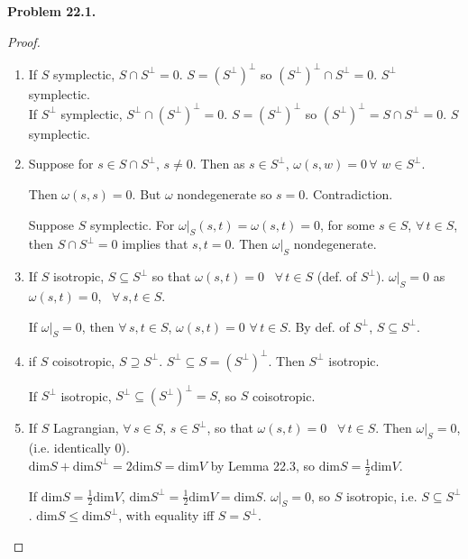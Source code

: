 \documentclass[11pt]{amsart}
\theoremstyle{definition}
\newcommand{\problemhead}[1]{\medskip\noindent\textbf{Problem #1.} }
\begin{document}
\problemhead{22.1}

\begin{proof}
\begin{enumerate}
  \item[(a)] If $S$ symplectic, $S \cap S^{\perp} = 0$.  $S=(S^{\perp})^{\perp}$ so $(S^{\perp})^{\perp} \cap S^{\perp} =0$.  $S^{\perp}$ symplectic.  \\
If $S^{\perp}$ symplectic, $S^{\perp} \cap (S^{\perp})^{\perp} = 0$.  $S=(S^{\perp})^{\perp}$ so $(S^{\perp})^{\perp} =S \cap S^{\perp} =0$.  $S$ symplectic.  \\
  \item[(b)] Suppose for $s\in S\cap S^{\perp}$, $s\neq 0$.  Then as $s\in S^{\perp}$, $\omega(s,w)=0 \, \forall \, \, w \in S^{\perp}$.

Then $\omega(s,s)=0$.  But $\omega$ nondegenerate so $s=0$.  Contradiction.

Suppose $S$ symplectic.  For $\left. \omega \right|_S(s,t) = \omega(s,t)=0$, for some $s \in S$, $\forall \, t \in S$, then $S\cap S^{\perp}=0$ implies that $s,t=0$.  Then $\left. \omega \right|_S$ nondegenerate.


  \item[(c)] If $S$ isotropic, $S\subseteq S^{\perp}$ so that $\omega(s,t)=0$ \, $\forall \, t \in S$ (def. of $S^{\perp}$).  $\left. \omega \right|_S =0$ as $\omega(s,t)=0$, \, $\forall \, s,t \in S$.

If $\left. \omega \right|_S =0$, then $\forall \, s,t \in S$, $\omega(s,t)=0 \, \, \forall \, t\in S$.  By def. of $S^{\perp}$, $S\subseteq S^{\perp}$.
  \item[(d)] if $S$ coisotropic, $S\supseteq S^{\perp}$.  $S^{\perp} \subseteq S=(S^{\perp})^{\perp}$.  Then $S^{\perp}$ isotropic.

If $S^{\perp}$ isotropic, $S^{\perp} \subseteq (S^{\perp})^{\perp} = S$, so $S$ coisotropic.
  \item[(e)] If $S$ Lagrangian, $\forall \, s \in S$, $s\in S^{\perp}$, so that $\omega(s,t) = 0$ \, $\forall \, t \in S$.  Then $\left. \omega \right|_S =0$, (i.e. identically $0$).  \\

$\text{dim}S + \text{dim}S^{\perp} = 2\text{dim}S = \text{dim}V $ by Lemma 22.3, so $\text{dim}S = \frac{1}{2} \text{dim}V$.

If $\text{dim}S = \frac{1}{2} \text{dim}V$, $\text{dim}S^{\perp} = \frac{1}{2} \text{dim}V = \text{dim}S$.  $\left. \omega \right|_S =0$, so $S$ isotropic, i.e. $S\subseteq S^{\perp}$.  $\text{dim}S \leq \text{dim}S^{\perp}$, with equality iff $S=S^{\perp}$.
\end{enumerate}
\end{proof}
\end{document}

